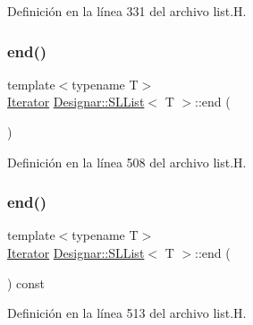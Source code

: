 Definición en la línea 331 del archivo list.\+H.

\mbox{\label{class_designar_1_1_s_l_list_a1fc18a918d23fd61767c2bf2f10f25b6}} 
\subsubsection{\texorpdfstring{end()}{end()}\hspace{0.1cm}{\footnotesize\ttfamily [1/2]}}
{\footnotesize\ttfamily template$<$typename T$>$ \\
\hyperlink{class_designar_1_1_s_l_list_1_1_iterator}{Iterator} \hyperlink{class_designar_1_1_s_l_list}{Designar\+::\+S\+L\+List}$<$ T $>$\+::end (\begin{DoxyParamCaption}{ }\end{DoxyParamCaption})\hspace{0.3cm}{\ttfamily [inline]}}



Definición en la línea 508 del archivo list.\+H.

\mbox{\label{class_designar_1_1_s_l_list_abeb2f9568d658b5da8831e7d993de353}} 
\subsubsection{\texorpdfstring{end()}{end()}\hspace{0.1cm}{\footnotesize\ttfamily [2/2]}}
{\footnotesize\ttfamily template$<$typename T$>$ \\
\hyperlink{class_designar_1_1_s_l_list_1_1_iterator}{Iterator} \hyperlink{class_designar_1_1_s_l_list}{Designar\+::\+S\+L\+List}$<$ T $>$\+::end (\begin{DoxyParamCaption}{ }\end{DoxyParamCaption}) const\hspace{0.3cm}{\ttfamily [inline]}}



Definición en la línea 513 del archivo list.\+H.

\mbox{\label{class_designar_1_1_s_l_list_ab4e0f44fe834563d47f36aab670b8c83}} 
